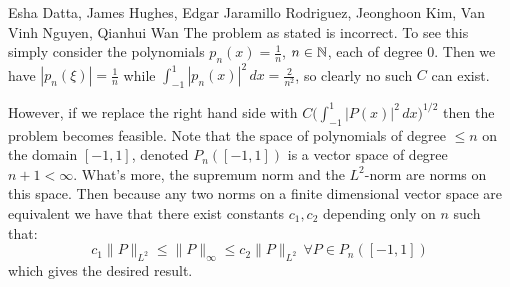 

\begin{solution}{Esha Datta, James Hughes, Edgar Jaramillo Rodriguez, Jeonghoon Kim, Van Vinh Nguyen, Qianhui Wan}
        The problem as stated is incorrect.
        To see this simply consider the polynomials $p_n(x) =\frac{1}{n}$, $n\in \mathbb{N}$, each of degree 0. Then we have $|p_n(\xi)| = \frac{1}{n}$ while $\int_{-1}^1|p_n(x)|^2\,dx = \frac{2}{n^2}$, so clearly no such $C$ can exist.

        However, if we replace the right hand side with $C \bigg(\int_{-1}^1 |P(x)|^2\,dx\bigg)^{1/2}$ then the problem becomes feasible.
        Note that the space of polynomials of degree $\leq n$ on the domain $[-1,1]$, denoted $P_n([-1,1])$ is a vector space of degree $n+1 <\infty$.
        What's more, the supremum norm and the $L^2$-norm are norms on this space.
        Then because any two norms on a finite dimensional vector space are equivalent we have that there exist constants $c_1,c_2$ depending only on $n$ such that:
        \[ c_1\lVert P \rVert_{L^2} \leq \lVert P \rVert_{\infty} \leq c_2\lVert P \rVert_{L^2} \, \forall P \in P_n([-1,1]) \]
        which gives the desired result.
\end{solution}

